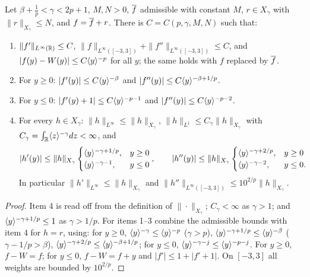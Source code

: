 \begin{lemma}
  \label{lem:c10_profile_consequences}
  Let $\beta+\frac1p<\gamma<2p+1$, $M,N>0$, $\overline{f}$ admissible with constant $M$, $r\in X_\gamma$ with
  $\|r\|_{X_\gamma}\le N$, and $f=\overline{f}+r$. There is $C=C(p,\gamma,M,N)$ such that:
  \begin{enumerate}
    \item $\|f'\|_{L^\infty(\mathbb{R})}\le C$, $\|f\|_{L^\infty([-3,3])}+\|f''\|_{L^\infty([-3,3])}\le C$, and
      $|f(y)-W(y)|\le C\langle y \rangle^{-p}$ for all $y$; the same holds with $f$ replaced by $\overline{f}$.
    \item For $y\ge0$: $|f'(y)|\le C\langle y \rangle^{-\beta}$ and $|f''(y)|\le C\langle y \rangle^{-\beta+1/p}$.
    \item For $y\le0$: $|f'(y)+1|\le C\langle y \rangle^{-p-1}$ and $|f''(y)|\le C\langle y \rangle^{-p-2}$.
    \item For every $h\in X_\gamma$: $\|h\|_{L^\infty}\le\|h\|_{X_\gamma}$,
      $\|h\|_{L^1}\le C_\gamma\|h\|_{X_\gamma}$ with $C_\gamma=\int_{\mathbb{R}}\langle z \rangle^{-\gamma}dz<\infty$, and
      \[
        |h'(y)|\le\|h\|_{X_\gamma}\begin{cases}\langle y \rangle^{-\gamma+1/p},&y\ge0\\ \langle y \rangle^{-\gamma-1},&y\le0\end{cases},
        \qquad
        |h''(y)|\le\|h\|_{X_\gamma}\begin{cases}\langle y \rangle^{-\gamma+2/p},&y\ge0\\ \langle y \rangle^{-\gamma-2},&y\le0.\end{cases}
      \]
      In particular $\|h'\|_{L^\infty}\le\|h\|_{X_\gamma}$ and $\|h''\|_{L^\infty([-3,3])}\le 10^{2/p}\|h\|_{X_\gamma}$.
  \end{enumerate}
\end{lemma}
\begin{proof}
  Item 4 is read off from the definition of $\|\cdot\|_{X_\gamma}$; $C_\gamma<\infty$ as $\gamma>1$; and
  $\langle y \rangle^{-\gamma+1/p}\le1$ as $\gamma>1/p$. For items 1--3 combine the admissible bounds with item 4
  for $h=r$, using: for $y\ge0$, $\langle y \rangle^{-\gamma}\le\langle y \rangle^{-p}$ ($\gamma>p$),
  $\langle y \rangle^{-\gamma+1/p}\le\langle y \rangle^{-\beta}$ ($\gamma-1/p>\beta$),
  $\langle y \rangle^{-\gamma+2/p}\le\langle y \rangle^{-\beta+1/p}$; for $y\le0$, $\langle y \rangle^{-\gamma-j}\le\langle y \rangle^{-p-j}$.
  For $y\ge0$, $f-W=f$; for $y\le0$, $f-W=f+y$ and $|f'|\le 1+|f'+1|$. On $[-3,3]$ all weights are
  bounded by $10^{2/p}$.
\end{proof}

